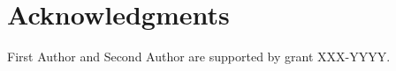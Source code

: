 \section*{Acknowledgments}\label{sec:acknowledgments}

First Author and Second Author are supported by grant XXX-YYYY.

